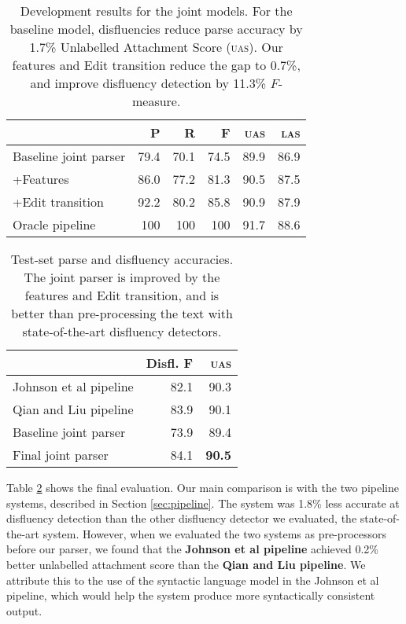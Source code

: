 \documentclass[11pt,letterpaper]{article}
\begin{document}
\begin{table}
    \centering
    \small
    \begin{tabular}{l|rrr|rr}
        & P & R & F & \textsc{uas} & \textsc{las} \\
        \hline \hline
Baseline joint parser &	79.4	&	70.1	&	74.5	&	89.9	&	86.9 \\
+Features &	86.0	&	77.2	&	81.3	&	90.5	&	87.5 \\ 
+Edit transition &	92.2	&	80.2	&	85.8	&	90.9	&	87.9 \\ 
\hline       
Oracle pipeline  & 100 & 100 & 100 & 91.7    & 88.6 \\
\hline
    \end{tabular}
    \caption{\small Development results for the joint models.  For the baseline model,
        disfluencies reduce
        parse accuracy by 1.7\% Unlabelled Attachment Score (\textsc{uas}). 
        Our features and Edit transition reduce the gap to
        0.7\%, and improve disfluency detection by 11.3\% $F$-measure.
        \label{tab:dev}}
\end{table}


\begin{table}
    \small
    \centering
    \begin{tabular}{l|r|r}
        & Disfl. F & \textsc{uas} \\
        \hline \hline
Johnson et al pipeline      & 82.1 & 90.3 \\ 
Qian and Liu  pipeline     & 83.9 & 90.1  \\
\hline
Baseline joint parser & 73.9 & 89.4 \\
Final joint parser    & 84.1 & \textbf{90.5} \\
\hline
    \end{tabular}
    \caption{\small Test-set parse and disfluency accuracies.
             The joint parser is improved by the features and Edit transition,
             and is better than pre-processing the text with state-of-the-art
             disfluency detectors.
    \label{tab:test}}
\vspace*{-1.0ex}
\end{table}



Table \ref{tab:test} shows the final evaluation.  
Our main comparison is with the two pipeline systems, described in Section
\ref{sec:pipeline}.  The \citet{Johnson04a} system was 1.8\% less
accurate at disfluency detection than the other disfluency detector we evaluated,
the state-of-the-art \citet{qian:13} system.  However, when we evaluated the two
systems as pre-processors before our parser, we found that the
\textbf{Johnson et al pipeline} achieved 0.2\% better unlabelled attachment score
than the \textbf{Qian and Liu pipeline}.  We attribute this to the use of the
\citet{Charniak01a} syntactic language model in the Johnson et al pipeline, which
would help the system produce more syntactically consistent output.
\end{document}
